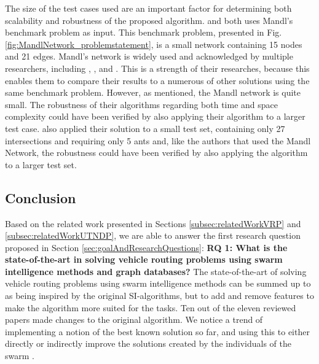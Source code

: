 The size of the test cases used are an important factor for determining both scalability and robustness of the proposed algorithm. \citet{nikolic14} and \citet{kechagiopoulos14} both uses Mandl's benchmark problem as input. This benchmark problem, presented in Fig. \vref{fig:MandlNetwork_problemstatement},  is a small network containing 15 nodes and 21 edges.  Mandl's network is widely used and acknowledged by multiple researchers, including \citet{baaj91}, \citet{chakroborty02}, and \citet{fan09}. This is a strength of their researches, because this enables them to compare their results to a numerous of other solutions using the same benchmark problem. However, as mentioned, the Mandl network is quite small. The robustness of their algorithms regarding both time and space complexity could have been verified by also applying their algorithm to a larger test case. \citet{salehi-nezhad07} also applied their solution to a small test set, containing only 27 intersections and requiring only 5 ants and, like the authors that used the Mandl Network, the robustness could have been verified by also applying the algorithm to a larger test set.  \newline

\subsection{Conclusion}
\label{subsec:relatedWorkConclusion}

Based on the related work presented in Sections \vref{subsec:relatedWorkVRP} and \vref{subsec:relatedWorkUTNDP}, we are able to answer the first research question proposed in Section \vref{sec:goalAndResearchQuestions}:
\newline
\newline
\textbf{RQ 1: What is the state-of-the-art in solving vehicle routing problems using swarm intelligence methods and graph databases?}
\newline
\newline
The state-of-the-art of solving vehicle routing problems using swarm intelligence methods can be summed up to as being inspired by the original SI-algorithms, but to add and remove features to make the algorithm more suited for the tasks. Ten out of the eleven reviewed papers made changes to the original algorithm. We notice a trend of implementing a notion of the best known solution so far, and using this to either directly or indirectly improve the solutions created by the individuals of the swarm \citep{tripathi09,sedighpour14,nikolic14}. 

